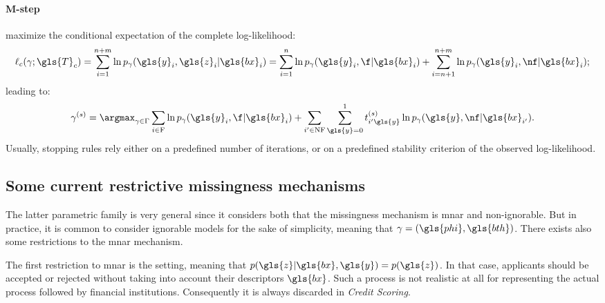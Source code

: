 \paragraph{M-step} maximize the conditional expectation of the complete log-likelihood:
\begin{equation}\label{eq:like.c}
\ell_c(\gamma;\gls{T}_c) = \sum_{i=1}^{n+m}\ln p_{\gamma}(\gls{y}_i,\gls{z}_i | \gls{bx}_i) = \sum_{i=1}^{n}\ln p_{\gamma}(\gls{y}_i,\f | \gls{bx}_i) + \sum_{i=n+1}^{n+m}\ln p_{\gamma}(\gls{y}_i,\nf | \gls{bx}_i);
\end{equation}
leading to:
\begin{equation}
\gamma^{(s)} = \argmax_{\gamma \in \Gamma} \sum_{i\in \text{F}} \ln p_{\gamma}(\gls{y}_i, \f|\gls{bx}_i) +  \sum_{i'\in \text{NF}}\sum_{\gls{y} = 0}^{1}t_{i'\gls{y}}^{(s)} \ln p_{\gamma}(\gls{y}, \nf | \gls{bx}_{i'}).
\end{equation}
Usually, stopping rules rely either on a predefined number of iterations, or on a predefined stability criterion of the observed log-likelihood.

\subsection{Some current restrictive missingness mechanisms}
\label{sec:mechanisms}

The latter parametric family is very general since it considers both that the missingness mechanism is \gls{mnar} and non-ignorable. But in practice, it is common to consider ignorable models for the sake of simplicity, meaning that $\gamma= (\gls{phi},\gls{bth})$. There exists also some restrictions to the \gls{mnar} mechanism. 

The first restriction to \gls{mnar} is the  setting, meaning that $p(\gls{z}| \gls{bx},\gls{y}) = p(\gls{z})$. In that case, applicants should be accepted or rejected without taking into account their descriptors $\gls{bx}$. Such a process is not realistic at all for representing the actual process followed by financial institutions. Consequently it is always discarded in \textit{Credit Scoring}.

